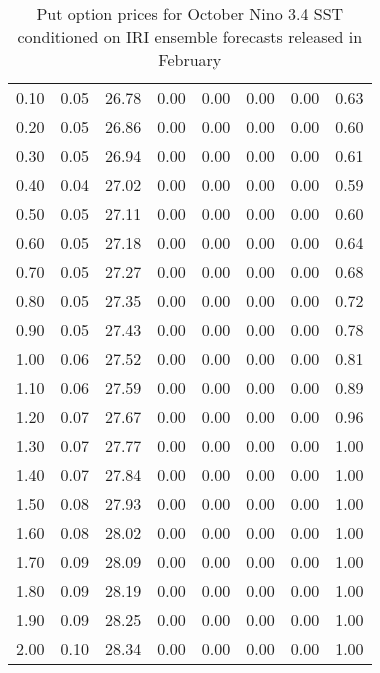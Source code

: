 \begin{table*}[ht]
\begin{tabular}{rrrrrrrr}
  0.10 & 0.05 & 26.78 & 0.00 & 0.00 & 0.00 & 0.00 & 0.63 \\ 
  0.20 & 0.05 & 26.86 & 0.00 & 0.00 & 0.00 & 0.00 & 0.60 \\ 
  0.30 & 0.05 & 26.94 & 0.00 & 0.00 & 0.00 & 0.00 & 0.61 \\ 
  0.40 & 0.04 & 27.02 & 0.00 & 0.00 & 0.00 & 0.00 & 0.59 \\ 
  0.50 & 0.05 & 27.11 & 0.00 & 0.00 & 0.00 & 0.00 & 0.60 \\ 
  0.60 & 0.05 & 27.18 & 0.00 & 0.00 & 0.00 & 0.00 & 0.64 \\ 
  0.70 & 0.05 & 27.27 & 0.00 & 0.00 & 0.00 & 0.00 & 0.68 \\ 
  0.80 & 0.05 & 27.35 & 0.00 & 0.00 & 0.00 & 0.00 & 0.72 \\ 
  0.90 & 0.05 & 27.43 & 0.00 & 0.00 & 0.00 & 0.00 & 0.78 \\ 
  1.00 & 0.06 & 27.52 & 0.00 & 0.00 & 0.00 & 0.00 & 0.81 \\ 
  1.10 & 0.06 & 27.59 & 0.00 & 0.00 & 0.00 & 0.00 & 0.89 \\ 
  1.20 & 0.07 & 27.67 & 0.00 & 0.00 & 0.00 & 0.00 & 0.96 \\ 
  1.30 & 0.07 & 27.77 & 0.00 & 0.00 & 0.00 & 0.00 & 1.00 \\ 
  1.40 & 0.07 & 27.84 & 0.00 & 0.00 & 0.00 & 0.00 & 1.00 \\ 
  1.50 & 0.08 & 27.93 & 0.00 & 0.00 & 0.00 & 0.00 & 1.00 \\ 
  1.60 & 0.08 & 28.02 & 0.00 & 0.00 & 0.00 & 0.00 & 1.00 \\ 
  1.70 & 0.09 & 28.09 & 0.00 & 0.00 & 0.00 & 0.00 & 1.00 \\ 
  1.80 & 0.09 & 28.19 & 0.00 & 0.00 & 0.00 & 0.00 & 1.00 \\ 
  1.90 & 0.09 & 28.25 & 0.00 & 0.00 & 0.00 & 0.00 & 1.00 \\ 
  2.00 & 0.10 & 28.34 & 0.00 & 0.00 & 0.00 & 0.00 & 1.00 \\ 
   \hline
\end{tabular}
\caption{Put option prices for October Nino 3.4 SST conditioned on IRI ensemble forecasts released in February} 
\end{table*}

